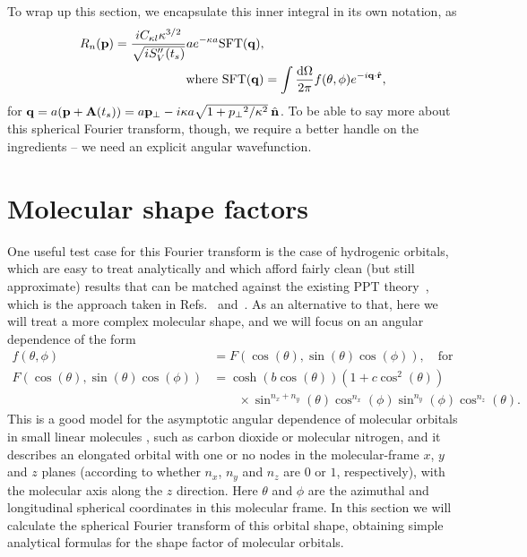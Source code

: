 To wrap up this section, we encapsulate this inner integral in its own notation, as 
\begin{subequations}
\begin{align}
R_n(\vbp)
 =
\frac{ iC_{\kappa l} \kappa^{3/2} }{\sqrt{iS_V''(\ts)}}
a
e^{-\kappa a}
\sft(\vbq),  &
\label{e2-shape-factor-via-sft}
\\ \text{where} \ 
\sft(\vbq)
& =
\int\frac{\d\Omega}{2\pi}
f(\theta,\phi)
e^{-i \vbq\cdot\ur } 
\label{e2-sft-definition}
,
\end{align}
\end{subequations}
for $\vb{q}=a(\vb{p}+\vb{A}({t_s}))=a{\vb{p}_{\perp}} -i \kappa a \sqrt{1+{p_{\perp}}^2/\kappa^2}\:\hat{\vb{n}}$. To be able to say more about this spherical Fourier transform, though, we require a better handle on the ingredients -- we need an explicit angular wavefunction.







\section{Molecular shape factors}
\label{sec:molecular-shape-factors}
One useful test case for this Fourier transform is the case of hydrogenic orbitals, which are easy to treat analytically and which afford fairly clean (but still approximate) results that can be matched against the existing PPT theory~\cite{perelomov_ionization-III_1967}, which is the approach taken in Refs.~\citealp{ MResReport} and~\citealp{ARM_initial}. As an alternative to that, here we will treat a more complex molecular shape, and we will focus on an angular dependence of the form
\begin{subequations}
\begin{align}
f(\theta,\phi) & = F(\cos(\theta), \sin(\theta)\cos(\phi))
, \quad \text{for}\\ 
F(\cos(\theta), \sin(\theta)\cos(\phi))
& = 
\cosh(b\cos(\theta)) (1+c\cos^2(\theta))  
\nonumber \\ & \qquad \times
\sin^{n_x+n_y}(\theta)\cos^{n_x}(\phi)\sin^{n_y}(\phi)  \cos^{n_z}(\theta)
.
\end{align}
\end{subequations}
This is a good model for the asymptotic angular dependence of molecular orbitals in small linear molecules \cite{radzig_reference_data, murray_tunnel_ionization_2011}, such as carbon dioxide or molecular nitrogen, and it describes an elongated orbital with one or no nodes in the molecular-frame $x$, $y$ and $z$ planes (according to whether $n_x$, $n_y$ and $n_z$ are $0$ or $1$, respectively), with the molecular axis along the $z$ direction. Here $\theta$ and $\phi$ are the azimuthal and longitudinal spherical coordinates in this molecular frame. In this section we will calculate the spherical Fourier transform of this orbital shape, obtaining simple analytical formulas for the shape factor of molecular orbitals.

